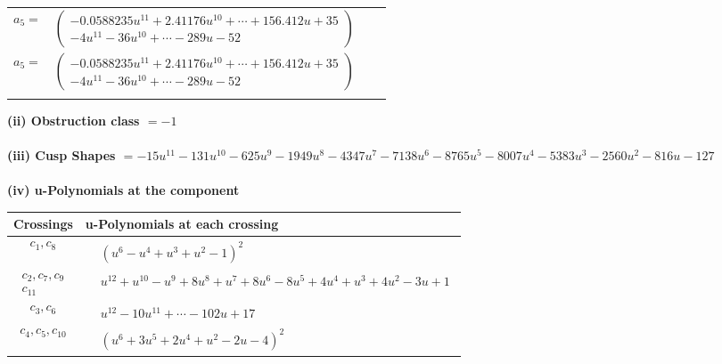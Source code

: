 \documentclass[1p]{elsarticle_modified}
\theoremstyle{definition}
\begin{document}
\begin{tabular}{m{7pt} m{180pt} m{7pt} m{180pt} }
\flushright $a_{5}=$&$\begin{pmatrix}-0.0588235 u^{11}+2.41176 u^{10}+\cdots+156.412 u+35\\-4 u^{11}-36 u^{10}+\cdots-289 u-52\end{pmatrix}$\\ \flushright $a_{5}=$&$\begin{pmatrix}-0.0588235 u^{11}+2.41176 u^{10}+\cdots+156.412 u+35\\-4 u^{11}-36 u^{10}+\cdots-289 u-52\end{pmatrix}$\\&\end{tabular}
\flushleft \textbf{(ii) Obstruction class $= -1$}\\~\\
\flushleft \textbf{(iii) Cusp Shapes $= -15 u^{11}-131 u^{10}-625 u^9-1949 u^8-4347 u^7-7138 u^6-8765 u^5-8007 u^4-5383 u^3-2560 u^2-816 u-127$}\\~\\
\newpage\renewcommand{\arraystretch}{1}
\flushleft \textbf{(iv) u-Polynomials at the component}\newline \\
\begin{tabular}{m{50pt}|m{274pt}}
Crossings & \hspace{64pt}u-Polynomials at each crossing \\
\hline $$\begin{aligned}c_{1},c_{8}\end{aligned}$$&$\begin{aligned}
&(u^6- u^4+u^3+u^2-1)^2
\end{aligned}$\\
\hline $$\begin{aligned}c_{2},c_{7},c_{9}\\c_{11}\end{aligned}$$&$\begin{aligned}
&u^{12}+u^{10}- u^9+8 u^8+u^7+8 u^6-8 u^5+4 u^4+u^3+4 u^2-3 u+1
\end{aligned}$\\
\hline $$\begin{aligned}c_{3},c_{6}\end{aligned}$$&$\begin{aligned}
&u^{12}-10 u^{11}+\cdots-102 u+17
\end{aligned}$\\
\hline $$\begin{aligned}c_{4},c_{5},c_{10}\end{aligned}$$&$\begin{aligned}
&(u^6+3 u^5+2 u^4+u^2-2 u-4)^2
\end{aligned}$\\
\hline
\end{tabular}\\~\\
\end{document}
